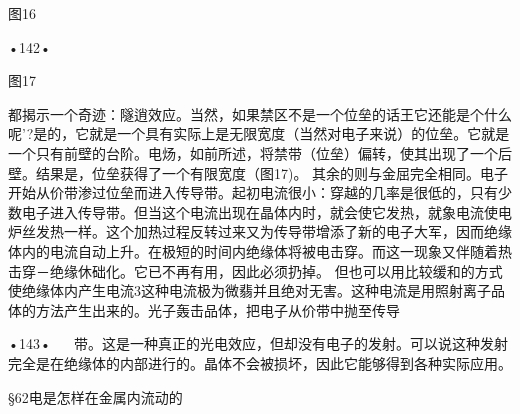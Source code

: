  

图16

•142•
  
 

图17

都揭示一个奇迹：隧逍效应。当然，如果禁区不是一个位垒的话王它还能是个什么呢'?是的，它就是一个具有实际上是无限宽度（当然对电子来说）的位垒。它就是一个只有前壁的台阶。电炀，如前所述，将禁带（位垒）偏转，使其出现了一个后壁。结果是，位垒获得了一个有限宽度（图17)。
其余的则与金屈完全相同。电子开始从价带渗过位垒而进入传导带。起初电流很小：穿越的几率是很低的，只有少数电子进入传导带。但当这个电流出现在晶体内时，就会使它发热，就象电流使电炉丝发热一样。这个加热过程反转过来又为传导带增添了新的电子大军，因而绝缘体内的电流自动上升。在极短的时间内绝缘体将被电击穿。而这一现象又伴随着热击穿－绝缘休础化。它已不再有用，因此必须扔掉。
但也可以用比较缓和的方式使绝缘体内产生电流3这种电流极为微翡并且绝对无害。这种电流是用照射离子品体的方法产生出来的。光子轰击品体，把电子从价带中抛至传导

•143•
  
带。这是一种真正的光电效应，但却没有电子的发射。可以说这种发射完全是在绝缘体的内部进行的。晶体不会被损坏，因此它能够得到各种实际应用。

§62电是怎样在金属内流动的

